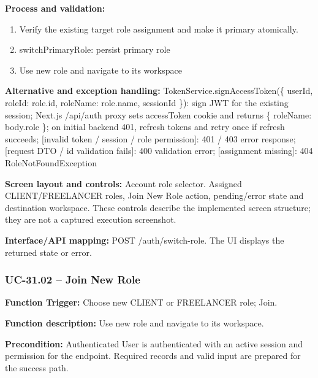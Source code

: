 \textbf{Process and validation:}
\begin{enumerate}
\item Verify the existing target role assignment and make it primary atomically.
\item switch\allowbreak{}Primary\allowbreak{}Role: persist primary role
\item Use new role and navigate to its workspace
\end{enumerate}
\textbf{Alternative and exception handling:} Token\allowbreak{}Service.sign\allowbreak{}Access\allowbreak{}Token(\{ user\allowbreak{}Id, role\allowbreak{}Id: role.id, role\allowbreak{}Name: role.name, session\allowbreak{}Id \}): sign JWT for the existing session; Next.js /\allowbreak{}api/\allowbreak{}auth proxy sets access\allowbreak{}Token cookie and returns \{ role\allowbreak{}Name: body.role \}; on initial backend 401, refresh tokens and retry once if refresh succeeds; [invalid token /\allowbreak{} session /\allowbreak{} role permission]: 401 /\allowbreak{} 403 error response; [request DTO /\allowbreak{} id validation fails]: 400 validation error; [assignment missing]: 404 Role\allowbreak{}Not\allowbreak{}Found\allowbreak{}Exception

\textbf{Screen layout and controls:} Account role selector. Assigned CLIENT/\allowbreak{}FREELANCER roles, Join New Role action, pending/\allowbreak{}error state and destination workspace. These controls describe the implemented screen structure; they are not a captured execution screenshot.

\textbf{Interface/\allowbreak{}API mapping:} POST /\allowbreak{}auth/\allowbreak{}switch-role. The UI displays the returned state or error.

\subsubsection{UC-31.02 -- Join New Role}
\textbf{Function Trigger:} Choose new CLIENT or FREELANCER role; Join.

\textbf{Function description:} Use new role and navigate to its workspace.

\textbf{Precondition:} Authenticated User is authenticated with an active session and permission for the endpoint. Required records and valid input are prepared for the success path.

